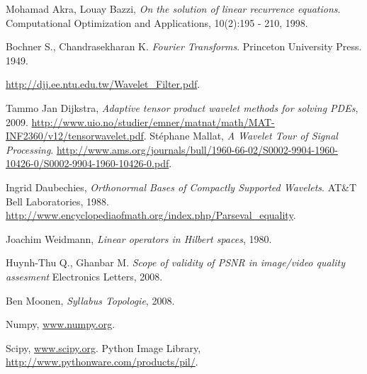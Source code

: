 \documentclass[11pt]{uvamath}
\theoremstyle{plain}
\theoremstyle{definition}
\theoremstyle{remark}
\begin{document}














\appendix



\begin{thebibliography}{11}

  Mohamad Akra,  Louay Bazzi,
  \emph{On the solution of linear recurrence equations}.
  Computational Optimization and Applications,
  10(2):195 - 210,
  1998.

  Bochner S., Chandrasekharan K.
  \emph{Fourier Transforms}.
  Princeton University Press.
  1949.

  \url{http://djj.ee.ntu.edu.tw/Wavelet_Filter.pdf}.

  Tammo Jan Dijkstra,
  \emph{Adaptive tensor product wavelet methods for solving PDEs}, 2009.
  \url{http://www.uio.no/studier/emner/matnat/math/MAT-INF2360/v12/tensorwavelet.pdf}.
  St\'ephane Mallat,
  \emph{A Wavelet Tour of Signal Processing}.
  \url{http://www.ams.org/journals/bull/1960-66-02/S0002-9904-1960-10426-0/S0002-9904-1960-10426-0.pdf}.

  Ingrid Daubechies, \emph{Orthonormal Bases of Compactly Supported Wavelets}.
  AT\&T Bell Laboratories, 1988.
  \url{http://www.encyclopediaofmath.org/index.php/Parseval_equality}.

Joachim Weidmann, \emph{Linear operators in Hilbert spaces}, 1980.

  Huynh-Thu Q., Ghanbar M.
  \emph{Scope of validity of PSNR in image/video quality assesment}
  Electronics Letters, 2008.

  Ben Moonen, \emph{Syllabus Topologie}, 2008.

	Numpy, \url{www.numpy.org}.
	
	Scipy, \url{www.scipy.org}.
	Python Image Library, \url{http://www.pythonware.com/products/pil/}.


\end{thebibliography}
\end{document}

